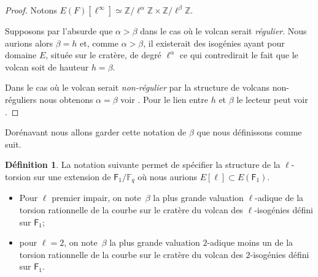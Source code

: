 \documentclass[10pt,a4paper]{book}
\theoremstyle{plain}
\theoremstyle{definition}
\theoremstyle{definition}
\theoremstyle{definition}
\theoremstyle{definition}
\theoremstyle{definition}
\newtheorem{defi}[thm]{Définition}
\theoremstyle{remark}
\theoremstyle{remark}
\theoremstyle{definition}
\begin{document}
\begin{proof}
Notons $E(F)[\ell^{\infty}]\simeq \mathbb{Z}/ \ell^{\alpha} \mathbb{Z} 
\times \mathbb{Z}/ \ell^{\beta} \mathbb{Z}$. 

Supposons par l'absurde que $\alpha > \beta$ dans le cas où le volcan serait 
\emph{régulier}. Nous aurions alors $\beta=h$ et, comme $\alpha>\beta$, il 
existerait des isogénies ayant pour domaine $E$, située sur le cratère, de 
degré $\ell^{\alpha}$ ce qui contredirait le fait que le volcan soit de hauteur 
$h=\beta$. 

Dans le cas où le volcan serait 
\emph{non-régulier} par la structure de volcans non-réguliers nous obtenons
$\alpha=\beta$ voir \cite[§5.3.1]{Ionica2010}. Pour le lien entre $h$ et
 $\beta$ le lecteur peut voir \cite[§5.3.1]{Ionica2010}. 
\end{proof}

Dorénavant nous allons garder cette notation de $\beta$ que nous définissons 
comme suit.

\begin{defi}
\label{def:bet:atk}
La notation suivante permet de spécifier la structure de la 
$\ell$-torsion sur une extension de $\mathsf{F}_1 /\mathbb{F}_q$ où nous 
aurions $E[\ell] \subset E(\mathsf{F}_1)$.
\begin{itemize}
\item Pour $\ell$ premier impair, on note~$\beta$ la plus
grande valuation $\ell$-adique de la torsion rationnelle de la courbe sur le 
cratère du volcan des $\ell$-isogénies défini sur $\mathsf{F}_1$; 
\item pour $\ell=2$, on note~$\beta$ la plus
grande valuation $2$-adique moins un de la torsion rationnelle de la courbe sur
le cratère du volcan des $2$-isogénies défini sur $\mathsf{F}_1$.
\end{itemize}
\end{defi}

\end{document}
